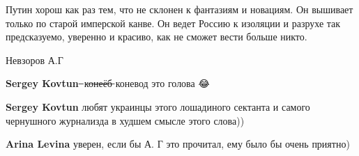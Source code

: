 \begin{itemize}
Путин хорош как раз тем, что не склонен к фантазиям и новациям. Он вышивает
только по старой имперской канве. Он ведет Россию к изоляции и разрухе так
предсказуемо, уверенно и красиво, как не сможет вести больше никто.

Невзоров А.Г

\begin{itemize}
 
\textbf{Sergey Kovtun}  ̶ к̶о̶н̶е̶ё̶б̶ коневод это голова 😂

 
\textbf{Sergey Kovtun} любят украинцы этого лошадиного сектанта и самого чернушного журнализда в худшем смысле этого слова))

 
\textbf{Arina Levina} уверен, если бы А. Г это прочитал, ему было бы очень приятно)
\end{itemize}

\end{itemize}


